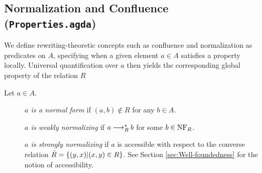 \subsection{Normalization and Confluence (\texttt{Properties.agda})}

We define rewriting-theoretic concepts such as confluence and normalization as predicates on $A$, specifying when a given element $a \in A$ satisfies a property locally. Universal quantification over $a$ then yields the corresponding global property of the relation $R$

\begin{definition} Let $a \in A$.
  \begin{description}
    \item[] \emph{$a$ is a normal form} if $(a,b) \notin R$ for any $b \in A$.
    \item[] \emph{$a$ is weakly normalizing} if $a \mathbin{\longrightarrow_R^*} b$ for some $b \in \mathrm{NF}_R$.
    \item[] \emph{$a$ is strongly normalizing} if $a$ is accessible with respect to the converse relation $\bar{R} = \left\{(y,x) | (x,y) \in R\right\}$.
    See Section \ref{sec:Well-foundedness} for the notion of accessibility.
  \end{description}
\end{definition}


